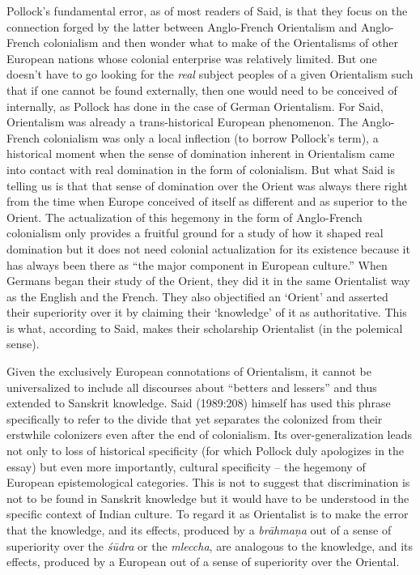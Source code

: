 Pollock’s fundamental error, as of most readers of Said, is that they focus on the connection forged by the latter between Anglo-French Orientalism and Anglo-French colonialism and then wonder what to make of the Orientalisms of other European nations whose colonial enterprise was relatively limited. But one doesn’t have to go looking for the {\sl real} subject peoples of a given Orientalism such that if one cannot be found externally, then one would need to be conceived of internally, as Pollock has done in the case of German Orientalism. For Said, Orientalism was already a trans-historical European phenomenon. The Anglo-French colonialism was only a local inflection (to borrow Pollock’s term), a historical moment when the sense of domination inherent in Orientalism came into contact with real domination in the form of colonialism. But what Said is telling us is that that sense of domination over the Orient was always there right from the time when Europe conceived of itself as different and as superior to the Orient. The actualization of this hegemony in the form of Anglo-French colonialism only provides a fruitful ground for a study of how it shaped real domination but it does not need colonial actualization for its existence because it has always been there as “the major component in European culture.” When Germans began their study of the Orient, they did it in the same Orientalist way as the English and the French. They also objectified an ‘Orient’ and asserted their superiority over it by claiming their ‘knowledge’ of it as authoritative. This is what, according to Said, makes their scholarship Orientalist (in the polemical sense).


Given the exclusively European connotations of Orientalism, it cannot be universalized to include all discourses about “betters and lessers” and thus extended to Sanskrit knowledge. Said (1989:208) himself has used this phrase specifically to refer to the divide that yet separates the colonized from their erstwhile colonizers even after the end of colonialism. Its over-generalization leads not only to loss of historical specificity (for which Pollock duly apologizes in the essay) but even more importantly, cultural specificity – the hegemony of European epistemological categories. This is not to suggest that discrimination is not to be found in Sanskrit knowledge but it would have to be understood in the specific context of Indian culture. To regard it as Orientalist is to make the error that the knowledge, and its effects, produced by a {\sl brāhmaṇa} out of a sense of superiority over the {\sl śūdra} or the {\sl mleccha}, are analogous to the knowledge, and its effects, produced by a European out of a sense of superiority over the Oriental.

